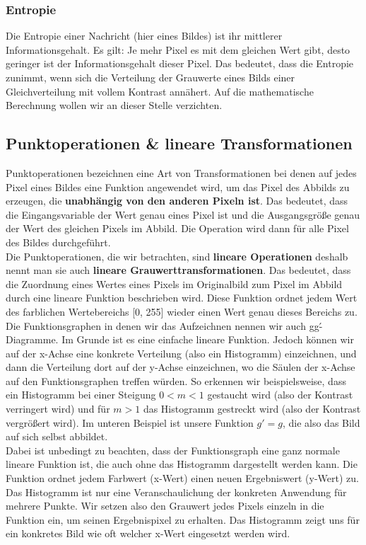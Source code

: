 \subsubsection{Entropie}
Die Entropie einer Nachricht (hier eines Bildes) ist ihr mittlerer Informationsgehalt.
Es gilt: Je mehr Pixel es mit dem gleichen Wert gibt, desto geringer ist der Informationsgehalt dieser Pixel. Das bedeutet, dass die Entropie zunimmt, wenn sich die Verteilung der Grauwerte eines Bilds einer Gleichverteilung mit vollem Kontrast annähert. Auf die mathematische Berechnung wollen wir an dieser Stelle verzichten.

\subsection{Punktoperationen \& lineare Transformationen}
\label{sec:Punktoperationen}
Punktoperationen bezeichnen eine Art von Transformationen bei denen auf jedes Pixel eines Bildes eine Funktion angewendet wird, um das Pixel des Abbilds zu erzeugen, die \textbf{unabhängig von den anderen Pixeln ist}. Das bedeutet, dass die Eingangsvariable der Wert genau eines Pixel ist und die Ausgangsgröße genau der Wert des gleichen Pixels im Abbild. Die Operation wird dann für alle Pixel des Bildes durchgeführt.\\
Die Punktoperationen, die wir betrachten, sind \textbf{lineare Operationen} deshalb nennt man sie auch \textbf{lineare Grauwerttransformationen}. Das bedeutet, dass die Zuordnung eines Wertes eines Pixels im Originalbild zum Pixel im Abbild durch eine lineare Funktion beschrieben wird. Diese Funktion ordnet jedem Wert des farblichen Wertebereichs [0, 255] wieder einen Wert genau dieses Bereichs zu. Die Funktionsgraphen in denen wir das Aufzeichnen nennen wir auch gg\'-Diagramme. Im Grunde ist es eine einfache lineare Funktion. Jedoch können wir auf der x-Achse eine konkrete Verteilung (also ein Histogramm) einzeichnen, und dann die Verteilung dort auf der y-Achse einzeichnen, wo die Säulen der x-Achse auf den Funktionsgraphen treffen würden. So erkennen wir beispielsweise, dass ein Histogramm bei einer Steigung $0 < m < 1$ gestaucht wird (also der Kontrast verringert wird) und für $m > 1$ das Histogramm gestreckt wird (also der Kontrast vergrößert wird). Im unteren Beispiel ist unsere Funktion $g' = g$, die also das Bild auf sich selbst abbildet.\\

Dabei ist unbedingt zu beachten, dass der Funktionsgraph eine ganz normale lineare Funktion ist, die auch ohne das Histogramm dargestellt werden kann. Die Funktion ordnet jedem Farbwert (x-Wert) einen neuen Ergebniswert (y-Wert) zu. Das Histogramm ist nur eine Veranschaulichung der konkreten Anwendung für mehrere Punkte. Wir setzen also den Grauwert jedes Pixels einzeln in die Funktion ein, um seinen Ergebnispixel zu erhalten. Das Histogramm zeigt uns für ein konkretes Bild wie oft welcher x-Wert eingesetzt werden wird.

